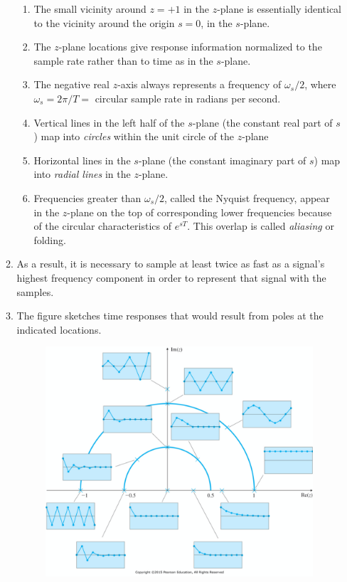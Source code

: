 \documentclass[landscape,14pt]{oblivoir}
\begin{document}
\begin{itemize}
\begin{enumerate}
\begin{enumerate}
			\item The small vicinity around $z=+1$ in the $z$-plane is essentially identical to the vicinity around the origin $s=0$, in the $s$-plane.
			\item The $z$-plane locations give response information normalized to the sample rate rather than to time as in the $s$-plane. 
			\item The negative real $z$-axis always represents a frequency of $\omega_s/2$, where $\omega_s = 2\pi/T = $ circular sample rate in radians per second. 
			\item Vertical lines in the left half of the $s$-plane (the constant real part of $s$) map into \emph{circles} within the unit circle of the $z$-plane 
			\item Horizontal lines in the $s$-plane (the constant imaginary part of $s$) map into \emph{radial lines} in the $z$-plane. 
			\item Frequencies greater than $\omega_s/2$, called the Nyquist frequency, appear in the $z$-plane on the top of corresponding lower frequencies because of the circular characteristics of $e^{sT}$. This overlap is called \emph{aliasing} or folding.  
		\end{enumerate} 
		\item As a result, it is necessary to sample at least twice as fast as a signal's highest frequency component in order to represent that signal with the samples. 
		\item The figure sketches time responses that would result from poles at the indicated locations.
		\begin{figure}[h]
			\includegraphics[width=14cm]{./FIG_Franklin/fig8-5.png}

\end{figure}
\end{enumerate}
\end{itemize}
\end{document}
